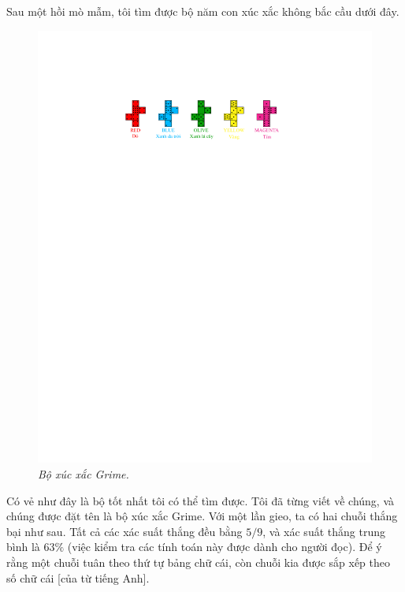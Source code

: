 \begin{multicols}{2}
\begin{figure}[H]
		\vspace*{-25pt}
	\end{figure}
	Sau một hồi mò mẫm, tôi tìm được bộ năm con xúc xắc không bắc cầu dưới đây.
	\begin{figure}[H]
		\centering
		\captionsetup{labelformat= empty, justification=centering}
		\includegraphics[width = 1\linewidth]{10}
		\caption{\small\textit{\color{quantoan}Bộ xúc xắc Grime.}}
		\vspace*{-15pt}
	\end{figure}
	Có vẻ như đây là bộ tốt nhất tôi có thể tìm được. Tôi đã từng viết về chúng, và chúng được đặt tên là bộ xúc xắc Grime.
	\vskip 0.05cm
	Với một lần gieo, ta có hai chuỗi thắng bại như sau.
	\vskip 0.05cm
	Tất cả các xác suất thắng đều bằng $5/9$, và xác suất thắng trung bình là $63\%$ (việc kiểm tra các tính toán này được dành cho người đọc). Để ý rằng một chuỗi tuân theo thứ tự bảng chữ cái, còn chuỗi kia được sắp xếp theo số chữ cái [của từ tiếng Anh].

\end{multicols}
